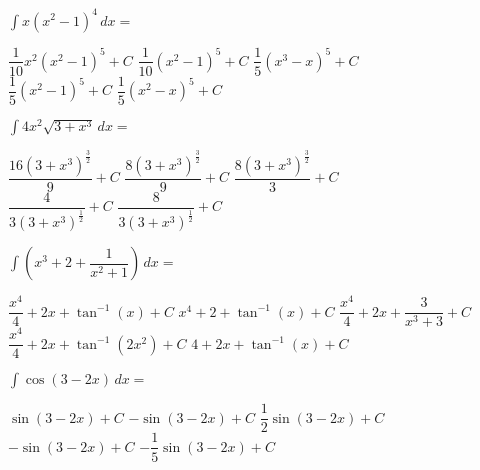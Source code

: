 \begin{questions}
    \question $\int x\left(x^2 - 1\right)^4 \, dx = $ \\

    \begin{oneparchoices}
        \choice $\dfrac{1}{10}x^2\left(x^2 - 1\right)^5 + C$
        \choice $\dfrac{1}{10}\left(x^2 - 1\right)^5 + C$
        \choice $\dfrac{1}{5}\left(x^3 - x\right)^5 + C$ \\[11pt]
        \makebox[0.22\textwidth] \choice $\dfrac{1}{5}\left(x^2 - 1\right)^5 + C$
        \makebox[0.22\textwidth] \choice $\dfrac{1}{5}\left(x^2 - x\right)^5 + C$
    \end{oneparchoices} \par \horizontalline

    \question $\int 4x^2\sqrt{3 + x^3} \, dx = $ \\

    \begin{oneparchoices}
        \choice $\dfrac{16\left(3 + x^3\right)^{\frac{3}{2}}}{9} + C$
        \choice $\dfrac{8\left(3 + x^3\right)^{\frac{3}{2}}}{9} + C$
        \choice $\dfrac{8\left(3 + x^3\right)^{\frac{3}{2}}}{3} + C$ \\[11pt]
        \makebox[0.22\textwidth] \choice $\dfrac{4}{3\left(3 + x^3\right)^{\frac{1}{2}}} + C$ 
        \makebox[0.21\textwidth] \choice $\dfrac{8}{3\left(3 + x^3\right)^{\frac{1}{2}}} + C$
    \end{oneparchoices} \par \horizontalline

    \question $\int \left(x^3 + 2 + \dfrac{1}{x^2 + 1}\right) \, dx = $ \\

    \begin{oneparchoices}
        \choice $\dfrac{x^4}{4} + 2x + \tan^{-1} (x) + C$
        \choice $x^4 + 2 + \tan^{-1} (x) + C$
        \choice $\dfrac{x^4}{4} + 2x + \dfrac{3}{x^3 + 3} + C$ \\[11pt]
        \makebox[0.16\textwidth] \choice $\dfrac{x^4}{4} + 2x + \tan^{-1} \left(2x^2\right) + C$
        \makebox[0.09\textwidth] \choice $4 + 2x + \tan^{-1} (x) + C$
    \end{oneparchoices} \par \horizontalline

    \question $\int \cos (3 - 2x) \, dx = $ \\

    \begin{oneparchoices}
        \choice $\sin (3 - 2x) + C$
        \choice $-\sin (3 - 2x) + C$
        \choice $\dfrac{1}{2}\sin (3 - 2x) + C$ \\[11pt]
        \makebox[0.18\textwidth] \choice $-\sin (3 - 2x) + C$
        \makebox[0.22\textwidth] \choice $-\dfrac{1}{5}\sin (3 - 2x) + C$
    \end{oneparchoices} \par \horizontalline


\end{questions}
